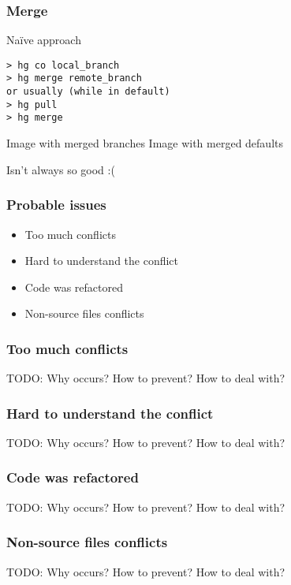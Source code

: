 \documentclass{beamer}
\begin{document}
\begin{frame}[fragile]
\frametitle{Merge}
\begin{exampleblock}{Naïve approach}
\begin{verbatim}
> hg co local_branch
> hg merge remote_branch
or usually (while in default)
> hg pull 
> hg merge 
\end{verbatim}
\end{exampleblock}
\begin{multicols}{2}
Image with merged branches
\columnbreak
{}
Image with merged defaults
\end{multicols}
\begin{center}
Isn't always so good :( 
\end{center}
\end{frame}

\begin{frame}
\frametitle{Probable issues}
\begin{itemize}
\item Too much conflicts
\item Hard to understand the conflict
\item Code was refactored
\item Non-source files conflicts
\end{itemize}
\end{frame}

\begin{frame}
\frametitle{Too much conflicts}
TODO: Why occurs? How to prevent? How to deal with? 
\end{frame}

\begin{frame}
\frametitle{Hard to understand the conflict}
TODO: Why occurs? How to prevent? How to deal with? 
\end{frame}

\begin{frame}
\frametitle{Code was refactored}
TODO: Why occurs? How to prevent? How to deal with? 
\end{frame}

\begin{frame}
\frametitle{Non-source files conflicts}
TODO: Why occurs? How to prevent? How to deal with? 
\end{frame}
\end{document}
